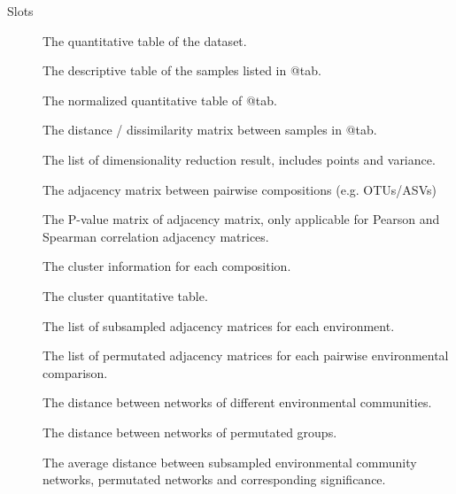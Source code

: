 \documentclass[a4paper]{book}
\begin{document}
\begin{Section}{Slots}

\begin{description}

\item[] The quantitative table of the dataset.

\item[] The descriptive table of the samples listed in @tab.

\item[] The normalized quantitative table of @tab.

\item[] The distance / dissimilarity matrix between samples in @tab.

\item[] The list of dimensionality reduction result, includes points and
variance.

\item[] The adjacency matrix between pairwise compositions (e.g. OTUs/ASVs)

\item[] The P-value matrix of adjacency matrix, only applicable for
Pearson and Spearman correlation adjacency matrices.

\item[] The cluster information for each composition.

\item[] The cluster quantitative table.

\item[] The list of subsampled adjacency matrices for each environment.

\item[] The list of permutated adjacency matrices for each pairwise
environmental comparison.

\item[] The distance between networks of different environmental
communities.

\item[] The distance between networks of permutated groups.

\item[] The average distance between subsampled environmental community
networks, permutated networks and corresponding significance.

\end{description}
\end{Section}
\end{document}
